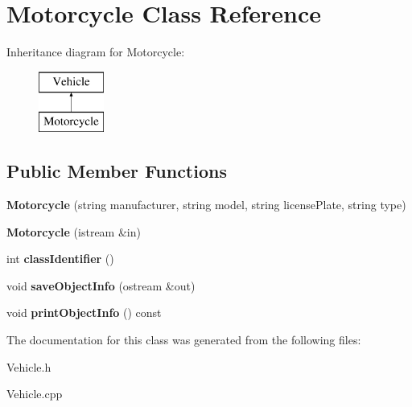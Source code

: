 \hypertarget{class_motorcycle}{}\section{Motorcycle Class Reference}
\label{class_motorcycle}
Inheritance diagram for Motorcycle\+:\begin{figure}[H]
\begin{center}
\leavevmode
\includegraphics[height=2.000000cm]{class_motorcycle}
\end{center}
\end{figure}
\subsection*{Public Member Functions}
\begin{DoxyCompactItemize}
\item 
\hypertarget{class_motorcycle_abe8c77f57d12d47162ae04a571955491}{}{\bfseries Motorcycle} (string manufacturer, string model, string license\+Plate, string type)\label{class_motorcycle_abe8c77f57d12d47162ae04a571955491}

\item 
\hypertarget{class_motorcycle_a3a9d3b9f1584e736612fcfb6232fb4f9}{}{\bfseries Motorcycle} (istream \&in)\label{class_motorcycle_a3a9d3b9f1584e736612fcfb6232fb4f9}

\item 
\hypertarget{class_motorcycle_a85a9d67156047b9b416d7fb263bf4917}{}int {\bfseries class\+Identifier} ()\label{class_motorcycle_a85a9d67156047b9b416d7fb263bf4917}

\item 
\hypertarget{class_motorcycle_a52febae0045ecd03806b9e59ac98d3af}{}void {\bfseries save\+Object\+Info} (ostream \&out)\label{class_motorcycle_a52febae0045ecd03806b9e59ac98d3af}

\item 
\hypertarget{class_motorcycle_a628e9a6a2fdb20752d85087941dec339}{}void {\bfseries print\+Object\+Info} () const \label{class_motorcycle_a628e9a6a2fdb20752d85087941dec339}

\end{DoxyCompactItemize}


The documentation for this class was generated from the following files\+:\begin{DoxyCompactItemize}
\item 
Vehicle.\+h\item 
Vehicle.\+cpp\end{DoxyCompactItemize}
